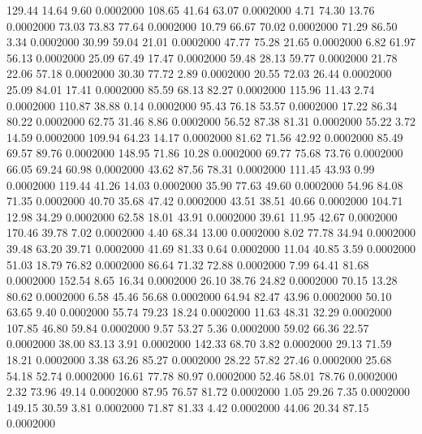  129.44   14.64    9.60   0.0002000
 108.65   41.64   63.07   0.0002000
   4.71   74.30   13.76   0.0002000
  73.03   73.83   77.64   0.0002000
  10.79   66.67   70.02   0.0002000
  71.29   86.50    3.34   0.0002000
  30.99   59.04   21.01   0.0002000
  47.77   75.28   21.65   0.0002000
   6.82   61.97   56.13   0.0002000
  25.09   67.49   17.47   0.0002000
  59.48   28.13   59.77   0.0002000
  21.78   22.06   57.18   0.0002000
  30.30   77.72    2.89   0.0002000
  20.55   72.03   26.44   0.0002000
  25.09   84.01   17.41   0.0002000
  85.59   68.13   82.27   0.0002000
 115.96   11.43    2.74   0.0002000
 110.87   38.88    0.14   0.0002000
  95.43   76.18   53.57   0.0002000
  17.22   86.34   80.22   0.0002000
  62.75   31.46    8.86   0.0002000
  56.52   87.38   81.31   0.0002000
  55.22    3.72   14.59   0.0002000
 109.94   64.23   14.17   0.0002000
  81.62   71.56   42.92   0.0002000
  85.49   69.57   89.76   0.0002000
 148.95   71.86   10.28   0.0002000
  69.77   75.68   73.76   0.0002000
  66.05   69.24   60.98   0.0002000
  43.62   87.56   78.31   0.0002000
 111.45   43.93    0.99   0.0002000
 119.44   41.26   14.03   0.0002000
  35.90   77.63   49.60   0.0002000
  54.96   84.08   71.35   0.0002000
  40.70   35.68   47.42   0.0002000
  43.51   38.51   40.66   0.0002000
 104.71   12.98   34.29   0.0002000
  62.58   18.01   43.91   0.0002000
  39.61   11.95   42.67   0.0002000
 170.46   39.78    7.02   0.0002000
   4.40   68.34   13.00   0.0002000
   8.02   77.78   34.94   0.0002000
  39.48   63.20   39.71   0.0002000
  41.69   81.33    0.64   0.0002000
  11.04   40.85    3.59   0.0002000
  51.03   18.79   76.82   0.0002000
  86.64   71.32   72.88   0.0002000
   7.99   64.41   81.68   0.0002000
 152.54    8.65   16.34   0.0002000
  26.10   38.76   24.82   0.0002000
  70.15   13.28   80.62   0.0002000
   6.58   45.46   56.68   0.0002000
  64.94   82.47   43.96   0.0002000
  50.10   63.65    9.40   0.0002000
  55.74   79.23   18.24   0.0002000
  11.63   48.31   32.29   0.0002000
 107.85   46.80   59.84   0.0002000
   9.57   53.27    5.36   0.0002000
  59.02   66.36   22.57   0.0002000
  38.00   83.13    3.91   0.0002000
 142.33   68.70    3.82   0.0002000
  29.13   71.59   18.21   0.0002000
   3.38   63.26   85.27   0.0002000
  28.22   57.82   27.46   0.0002000
  25.68   54.18   52.74   0.0002000
  16.61   77.78   80.97   0.0002000
  52.46   58.01   78.76   0.0002000
   2.32   73.96   49.14   0.0002000
  87.95   76.57   81.72   0.0002000
   1.05   29.26    7.35   0.0002000
 149.15   30.59    3.81   0.0002000
  71.87   81.33    4.42   0.0002000
  44.06   20.34   87.15   0.0002000
